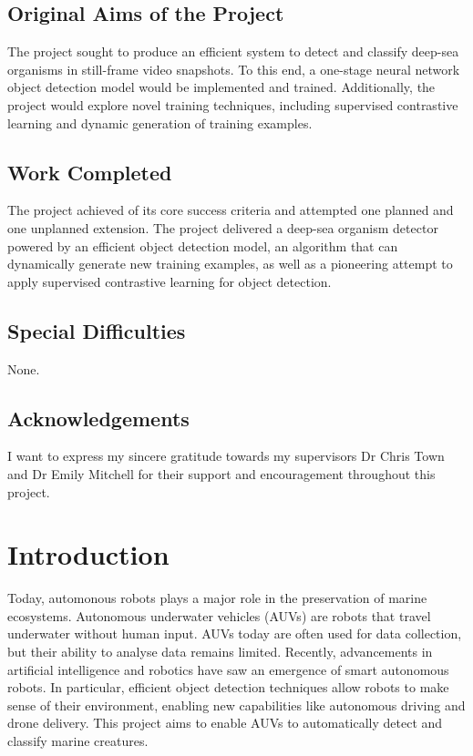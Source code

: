 \documentclass[12pt,a4paper,twoside,openany]{report}
\begin{document}
\section*{Original Aims of the Project}
The project sought to produce an efficient system to detect and classify deep-sea organisms in still-frame video snapshots. To this end, a one-stage neural network object detection model would be implemented and trained. Additionally, the project would explore novel training techniques, including supervised contrastive learning and dynamic generation of training examples.

\section*{Work Completed}
The project achieved of its core success criteria and attempted one planned and one unplanned extension. The project delivered a deep-sea organism detector powered by an efficient object detection model, an algorithm that can dynamically generate new training examples, as well as a pioneering attempt to apply supervised contrastive learning for object detection.

\section*{Special Difficulties}
None.

\tableofcontents

\newpage
\section*{Acknowledgements}
I want to express my sincere gratitude towards my supervisors Dr Chris Town and Dr Emily Mitchell for their support and encouragement throughout this project.

\pagestyle{headings}

\chapter{Introduction}

Today, automonous robots plays a major role in the preservation of marine ecosystems. Autonomous underwater vehicles (AUVs) are robots that travel underwater without human input. AUVs today are often used for data collection, but their ability to analyse data remains limited.  Recently, advancements in artificial intelligence and robotics have saw an emergence of smart autonomous robots. In particular, efficient object detection techniques allow robots to make sense of their environment, enabling new capabilities like autonomous driving and drone delivery. This project aims to enable AUVs to automatically detect and classify marine creatures.
\end{document}
